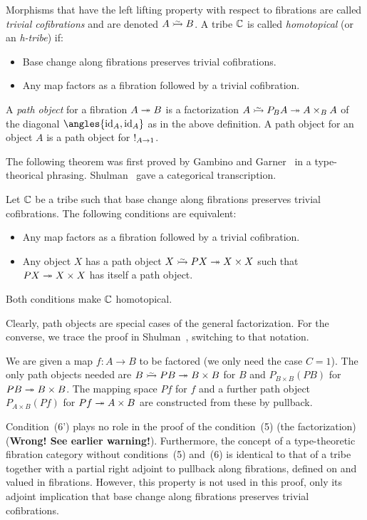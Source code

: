 \documentclass[reqno,10pt,a4paper,oneside]{amsart}
\begin{document}
Morphisms that have the left lifting property with respect to fibrations are called \emph{trivial cofibrations} and are denoted $A \acof B$.
A tribe $\mathbb{C}$ is called \emph{homotopical} (or an \emph{h-tribe}) if:
\begin{itemize}
\item
Base change along fibrations preserves trivial cofibrations.
\item
Any map factors as a fibration followed by a trivial cofibration.
\end{itemize}

A \emph{path object} for a fibration $A \twoheadrightarrow B$ is a factorization $A \acof P_B A \fib A \times_B A$ of the diagonal $\angles{\id_A, \id_A}$ as in the above definition.
A path object for an object $A$ is a path object for $\mathord{!}_{A \to 1}$.

The following theorem was first proved by Gambino and Garner~\cite{gambino-garner:idtypewfs} in a type-theorical phrasing.
Shulman~\cite{shulman:inverse-diagrams} gave a categorical transcription.

\begin{theorem}
\label{wfs-from-path-objects}
Let $\mathbb{C}$ be a tribe such that base change along fibrations preserves trivial cofibrations.
The following conditions are equivalent:
\begin{itemize}
\item
Any map factors as a fibration followed by a trivial cofibration.
\item
Any object $X$ has a path object $X \acof P X \fib X \times X$ such that $P X \twoheadrightarrow X \times X$ has itself a path object.
\end{itemize}
Both conditions make $\mathbb{C}$ homotopical.
\end{theorem}

Clearly, path objects are special cases of the general factorization.
For the converse, we trace the proof in Shulman~\cite[Lemma~2.4]{shulman:inverse-diagrams}, switching to that notation.

We are given a map $f : A \to B$ to be factored (we only need the case $C = 1$).
The only path objects needed are $B \acof P B \fib B \times B$ for $B$ and $P_{B \times B} (P B)$ for $P B \twoheadrightarrow B \times B$.
The mapping space $P f$ for $f$ and a further path object $P_{A \times B} (P f)$ for $P f \twoheadrightarrow A \times B$ are constructed from these by pullback.

Condition~(6') plays no role in the proof of the condition~(5) (the factorization) (\textbf{Wrong! See earlier warning!}).
Furthermore, the concept of a type-theoretic fibration category without conditions~(5) and~(6) is identical to that of a tribe together with a partial right adjoint to pullback along fibrations, defined on and valued in fibrations.
However, this property is not used in this proof, only its adjoint implication that base change along fibrations preserves trivial cofibrations.
\end{document}
